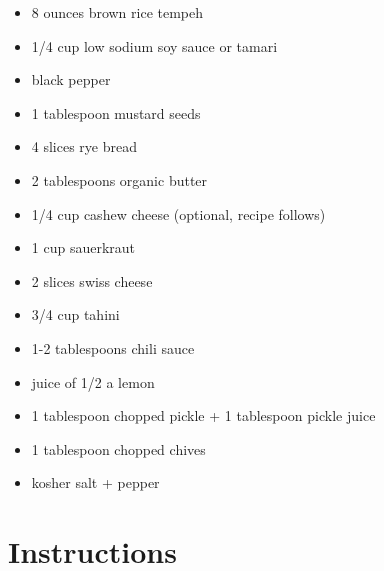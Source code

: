 \documentclass[
  letterpaper,
  DIV=11,
  numbers=noendperiod,
  titlepage=false]{scrreprt}
\providecommand{\tightlist}{%
  \setlength{\itemsep}{0pt}\setlength{\parskip}{0pt}}\usepackage{longtable,booktabs,array}
\begin{document}
\begin{itemize}
\tightlist
\item
  8 ounces brown rice tempeh
\item
  1/4 cup low sodium soy sauce or tamari
\item
  black pepper
\item
  1 tablespoon mustard seeds
\item
  4 slices rye bread
\item
  2 tablespoons organic butter
\item
  1/4 cup cashew cheese (optional, recipe follows)
\item
  1 cup sauerkraut
\item
  2 slices swiss cheese
\item
  3/4 cup tahini
\item
  1-2 tablespoons chili sauce
\item
  juice of 1/2 a lemon
\item
  1 tablespoon chopped pickle + 1 tablespoon pickle juice
\item
  1 tablespoon chopped chives
\item
  kosher salt + pepper
\end{itemize}

\section{Instructions}\label{instructions-148}
\end{document}
